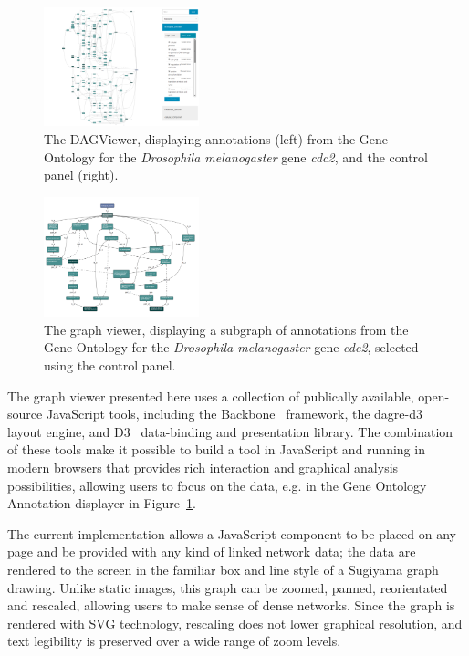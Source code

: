 \documentclass[10pt,a4paper,twocolumn]{article}
\begin{document}
\begin{figure}[htb]
\centering
\includegraphics[width=0.4\textwidth]{dagify.png}
\caption{
    \label{fig:1}
    The DAGViewer, displaying annotations (left) from the Gene Ontology for
    the \textit{Drosophila melanogaster} gene \emph{cdc2},
    and the control panel (right).
}
\end{figure}

\begin{figure}[htb]
\centering
\includegraphics[width=0.4\textwidth]{dagify-subgraph.png}
\caption{
  \label{fig:2}
  The graph viewer, displaying a subgraph of annotations from the Gene Ontology
  for the \textit{Drosophila melanogaster} gene \emph{cdc2}, selected using the
  control panel.
}
\end{figure}

The graph viewer presented here uses a collection of publically available,
open-source JavaScript tools, including the Backbone~\cite{backbone} framework,
the dagre-d3~\cite{dagre-d3} layout engine, and D3~\cite{d3} data-binding and
presentation library. The combination of these tools make it possible to build a
tool in JavaScript and running in modern browsers that provides rich interaction
and graphical analysis possibilities, allowing users to focus on the data, e.g.
in the Gene Ontology Annotation displayer in Figure~\ref{fig:1}.

The current implementation allows a JavaScript component to be placed on any
page and be provided with any kind of linked network data; the data are rendered
to the screen in the familiar box and line style of a Sugiyama graph drawing.
Unlike static images, this graph can be zoomed, panned, reorientated and
rescaled, allowing users to make sense of dense networks. Since the graph is
rendered with SVG technology, rescaling does not lower graphical resolution, and
text legibility is preserved over a wide range of zoom levels.
\end{document}
